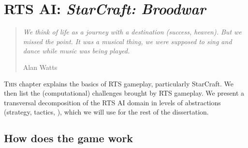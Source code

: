 \chapter{RTS AI: \textit{StarCraft: Broodwar}}

\begin{quotation}\textit{
We think of life as a journey with a destination (success, heaven). But we missed the point. It was a musical thing, we were supposed to sing and dance while music was being played.}\\
\begin{flushright}Alan Watts\end{flushright}
\end{quotation}

\lettrine{T}{his} chapter explains the basics of RTS gameplay, particularly StarCraft. We then list the (computational) challenges brought by RTS gameplay. We present a transversal decomposition of the RTS AI domain in levels of abstractions (strategy, tactics, ), which we will use for the rest of the dissertation.

\chaptertoc

\section{How does the game work}

